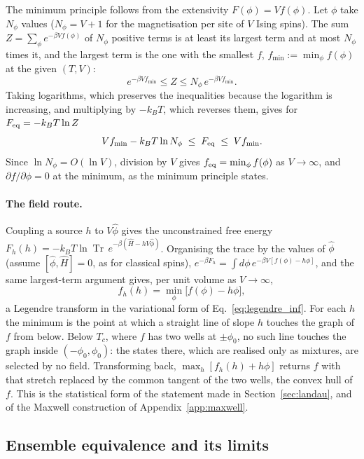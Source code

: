 \documentclass[10pt,a4paper]{article}
\theoremstyle{remark}
\newcommand{\Tr}{\operatorname{Tr}}
\begin{document}
The minimum principle follows from the extensivity $F(\phi)=Vf(\phi)$. Let
$\phi$ take $N_\phi$ values ($N_\phi=V+1$ for the magnetisation per site of
$V$ Ising spins). The sum $Z=\sum_\phi e^{-\beta Vf(\phi)}$ of $N_\phi$
positive terms is at least its largest term and at most $N_\phi$ times it, and
the largest term is the one with the smallest $f$,
$f_{\min}:=\min_\phi f(\phi)$ at the given $(T,V)$:
\[
  e^{-\beta Vf_{\min}}\leq Z\leq N_\phi\,e^{-\beta Vf_{\min}} .
\]
Taking logarithms, which preserves the inequalities because the logarithm is
increasing, and multiplying by $-k_BT$, which reverses them, gives for
$F_{\rm eq}=-k_BT\ln Z$
\[
  Vf_{\min}-k_BT\ln N_\phi\;\leq\;F_{\rm eq}\;\leq\;Vf_{\min} .
\]
Since $\ln N_\phi=O(\ln V)$, division by $V$ gives
$f_{\rm eq}=\min_\phi f(\phi)$ as $V\to\infty$, and
$\partial f/\partial\phi=0$ at the minimum, as the minimum principle states.

\paragraph{The field route.} Coupling a source $h$ to
$V\hat\phi$ gives the unconstrained free energy
$F_h(h)=-k_BT\ln\Tr\,e^{-\beta(\hat H-hV\hat\phi)}$. Organising the trace by
the values of $\hat\phi$ (assume $[\hat\phi,\hat H]=0$, as for classical
spins), $e^{-\beta F_h}=\int d\phi\,e^{-\beta V[f(\phi)-h\phi]}$, and the same
largest-term argument gives, per unit volume as $V\to\infty$,
\[
  f_h(h)=\min_\phi\big[f(\phi)-h\phi\big] ,
\]
a Legendre transform in the variational form of Eq.~\eqref{eq:legendre_inf}.
For each $h$ the minimum is the point at which a straight line of slope $h$
touches the graph of $f$ from below. Below $T_c$, where $f$ has two wells at
$\pm\phi_0$, no such line touches the graph inside $(-\phi_0,\phi_0)$: the
states there, which are realised only as mixtures, are selected by no field.
Transforming back, $\max_h[f_h(h)+h\phi]$ returns $f$ with that stretch
replaced by the common tangent of the two wells, the convex hull of $f$. This
is the statistical form of the statement made in Section~\ref{sec:landau},
and of the Maxwell construction of Appendix~\ref{app:maxwell}.

\subsection{Ensemble equivalence and its limits}
\label{sec:equivalence}
\end{document}
